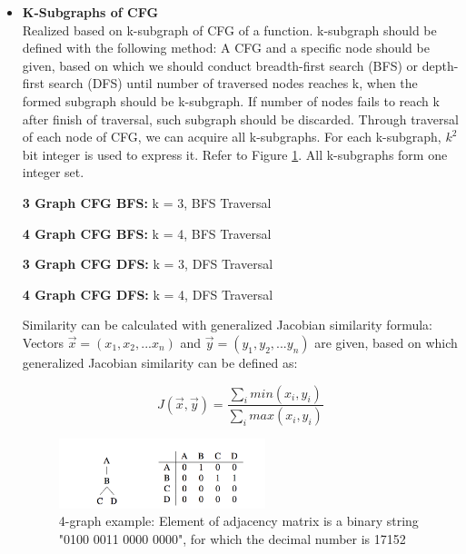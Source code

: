 \begin{itemize}
	
	\item \textbf{K-Subgraphs of CFG} \\
	Realized based on k-subgraph of CFG of a function. k-subgraph should be defined with the following method: A CFG and a specific node should be given, based on which we should conduct breadth-first search (BFS) or depth-first search (DFS) until number of traversed nodes reaches k, when the formed subgraph should be k-subgraph. If number of nodes fails to reach k after finish of traversal, such subgraph should be discarded. Through traversal of each node of CFG, we can acquire all k-subgraphs. For each k-subgraph, $k^2$ bit integer is used to express it. Refer to Figure \ref{fig:graph-ex}. All k-subgraphs form one integer set.
	
	\textbf{3 Graph CFG BFS:} k = 3, BFS Traversal
	
	\textbf{4 Graph CFG BFS:} k = 4, BFS Traversal
	
	\textbf{3 Graph CFG DFS:} k = 3, DFS Traversal
	
	\textbf{4 Graph CFG DFS:} k = 4, DFS Traversal
	
	Similarity can be calculated with generalized Jacobian similarity formula: Vectors $\vec{x}=(x_{1}, x_{2}, ...x_{n})$ and $\vec{y}=(y_{1}, y_{2}, ...y_{n})$ are given, based on which generalized Jacobian similarity can be defined as:
	
	
	\begin{equation}
	J(\vec{x}, \vec{y})=\frac{\sum_imin(x_{i}, y_{i})}{\sum_imax(x_{i}, y_{i})}
	\end{equation}
	
	\begin{figure}[h]
	\centering
	\includegraphics[width=6cm]{./figs/graph-matrix.png}
	\caption{4-graph example: Element of adjacency matrix is a binary string "0100 0011 0000 0000", for which the decimal number is 17152}
	\label{fig:graph-ex}
	\end{figure}


\end{itemize}
